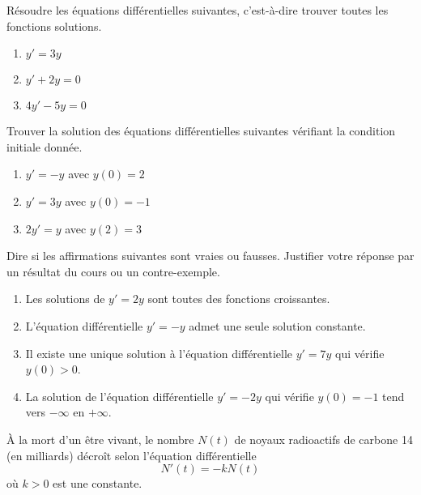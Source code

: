 \documentclass[11pt,class=report,crop=false]{standalone}
\begin{document}


\bigskip
\bigskip



\exercice{}
\enonce
Résoudre les équations différentielles suivantes, c'est-à-dire trouver toutes les fonctions solutions.
\begin{enumerate}
  \item $y'=3y$
  \item $y'+2y=0$
  \item $4y'-5y=0$
\end{enumerate} 
\finenonce

\finexercice

\exercice{}
\enonce
Trouver la solution des équations différentielles suivantes vérifiant la condition initiale donnée.
\begin{enumerate}
  \item $y'=-y$ avec $y(0)=2$
  \item $y'=3y$ avec $y(0)=-1$
  \item $2y'=y$ avec $y(2)=3$
\end{enumerate} 
\finenonce

\finexercice


\exercice{}
\enonce
Dire si les affirmations suivantes sont vraies ou fausses. Justifier votre réponse par un résultat du cours ou un contre-exemple.
 \begin{enumerate}
  \item \og{}Les solutions de $y'=2y$ sont toutes des fonctions croissantes.\fg{}
  \item \og{}L'équation différentielle $y'=-y$ admet une seule solution constante.\fg{}
  \item \og{}Il existe une unique solution à l'équation différentielle $y'=7y$ qui vérifie $y(0)>0$.\fg{}
  \item \og{}La solution de l'équation différentielle $y'=-2y$ qui vérifie $y(0)=-1$ tend vers $-\infty$ en $+\infty$.\fg{}
\end{enumerate} 
\finenonce

\finexercice


\exercice{}
\enonce
\`A la mort d'un être vivant, le nombre $N(t)$ de noyaux radioactifs de carbone 14 (en milliards) décroît selon l'équation différentielle
$$N'(t) = -k N(t)$$
où $k>0$ est une constante.
\end{document}
